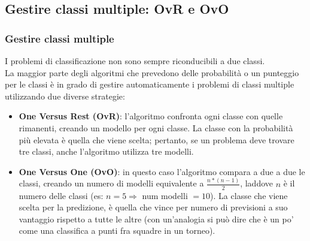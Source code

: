\subsection[Gestire classi multiple: OvR e OvO]{Gestire classi multiple: OvR e OvO}



\begin{frame}
	
	\frametitle{Gestire classi multiple}
	I problemi di classificazione non sono sempre riconducibili a due classi.\\
	La maggior parte degli algoritmi che prevedono delle probabilità o un punteggio per le classi è in grado di gestire automaticamente i problemi di classi multiple utilizzando due diverse strategie:
	
	\begin{itemize}
		\item \textbf{One Versus Rest (OvR)}: l'algoritmo confronta ogni classe con quelle rimanenti, creando un modello per ogni classe. La classe con la probabilità più elevata è quella che viene scelta; pertanto, se un problema deve trovare tre classi, anche l'algoritmo utilizza tre modelli.
		\item \textbf{One Versus One (OvO)}: in questo caso l'algoritmo compara a due a due le classi, creando un numero di modelli equivalente a $ \frac{n * (n-1)}{2}$, laddove $n$ è il numero delle classi (es: $n=5 \Rightarrow$ num modelli $=10$). La classe che viene scelta per la predizione, è quella che vince per numero di previsioni a suo vantaggio rispetto a tutte le altre (con un'analogia si può dire che è un po' come una classifica a punti fra squadre in un torneo).
	\end{itemize}
	
\end{frame}


